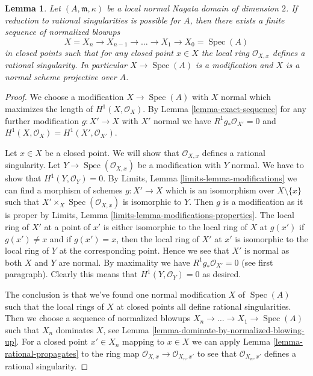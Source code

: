 \documentclass{stacks-project}
\theoremstyle{plain}
\newtheorem{lemma}[subsection]{Lemma}
\theoremstyle{definition}
\theoremstyle{remark}
\numberwithin{equation}{subsection}
\def\Spec{\mathop{\mathrm{Spec}}}
\begin{document}
\begin{lemma}
\label{lemma-reduce-to-rational}
Let $(A, \mathfrak m, \kappa)$ be a local normal Nagata domain
of dimension $2$. If reduction to rational singularities is possible
for $A$, then there exists a finite sequence of normalized blowups
$$
X = X_n \to X_{n - 1} \to \ldots \to X_1 \to X_0 = \Spec(A)
$$
in closed points such that for any closed point $x \in X$
the local ring $\mathcal{O}_{X, x}$ defines a rational singularity.
In particular $X \to \Spec(A)$ is a modification and $X$
is a normal scheme projective over $A$.
\end{lemma}

\begin{proof}
We choose a modification $X \to \Spec(A)$ with $X$ normal
which maximizes the length of $H^1(X, \mathcal{O}_X)$.
By Lemma \ref{lemma-exact-sequence}
for any further modification $g : X' \to X$ with $X'$ normal
we have $R^1g_*\mathcal{O}_{X'} = 0$ and
$H^1(X, \mathcal{O}_X) = H^1(X', \mathcal{O}_{X'})$.

\medskip\noindent
Let $x \in X$ be a closed point. We will show that $\mathcal{O}_{X, x}$
defines a rational singularity. Let $Y \to \Spec(\mathcal{O}_{X, x})$
be a modification with $Y$ normal. We have to show that
$H^1(Y, \mathcal{O}_Y) = 0$. By
Limits, Lemma \ref{limits-lemma-modifications}
we can find a morphism of schemes $g : X' \to X$ which is an isomorphism
over $X \setminus \{x\}$ such that $X' \times_X \Spec(\mathcal{O}_{X, x})$
is isomorphic to $Y$. Then $g$ is a modification as it is proper by
Limits, Lemma \ref{limits-lemma-modifications-properties}.
The local ring of $X'$ at a point of $x'$ is either isomorphic
to the local ring of $X$ at $g(x')$ if $g(x') \not = x$ and
if $g(x') = x$, then the local ring of $X'$ at $x'$ is isomorphic
to the local ring of $Y$ at the corresponding point. Hence we see
that $X'$ is normal as both $X$ and $Y$ are normal. By maximality
we have $R^1g_*\mathcal{O}_{X'} = 0$ (see first paragraph). Clearly
this means that $H^1(Y, \mathcal{O}_Y) = 0$ as desired.

\medskip\noindent
The conclusion is that we've found one normal modification $X$
of $\Spec(A)$ such that the local rings of $X$ at closed points all define
rational singularities. Then we choose a sequence of normalized
blowups $X_n \to \ldots \to X_1 \to \Spec(A)$ such that $X_n$
dominates $X$, see Lemma \ref{lemma-dominate-by-normalized-blowing-up}.
For a closed point $x' \in X_n$ mapping to $x \in X$ we can apply
Lemma \ref{lemma-rational-propagates} to the ring map
$\mathcal{O}_{X, x} \to \mathcal{O}_{X_n, x'}$
to see that $\mathcal{O}_{X_n, x'}$ defines a rational singularity.
\end{proof}
\end{document}
